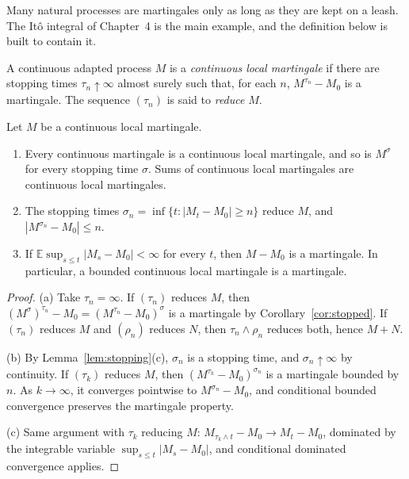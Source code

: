 Many natural processes are martingales only as long as they are kept on a leash. The It\^o integral of Chapter~4 is the main example, and the definition below is built to contain it.

\begin{definition}\label{def:localmart}
A continuous adapted process $M$ is a \emph{continuous local martingale} if there are stopping times $\tau_n\uparrow\infty$ almost surely such that, for each $n$, $M^{\tau_n}-M_0$ is a martingale.
The sequence $(\tau_n)$ is said to \emph{reduce} $M$.
\end{definition}

\begin{proposition}\label{prop:localmart}
Let $M$ be a continuous local martingale.
\begin{enumerate}[label=(\alph*)]
\item Every continuous martingale is a continuous local martingale, and so is $M^\sigma$ for every stopping time $\sigma$. Sums of continuous local martingales are continuous local martingales.
\item The stopping times $\sigma_n=\inf\{t:|M_t-M_0|\ge n\}$ reduce $M$, and $|M^{\sigma_n}-M_0|\le n$.
\item If $\mathbb E\sup_{s\le t}|M_s-M_0|<\infty$ for every $t$, then $M-M_0$ is a martingale. In particular, a bounded continuous local martingale is a martingale.
\end{enumerate}
\end{proposition}

\begin{proof}
(a) Take $\tau_n=\infty$. If $(\tau_n)$ reduces $M$, then $(M^\sigma)^{\tau_n}-M_0=(M^{\tau_n}-M_0)^\sigma$ is a martingale by Corollary~\ref{cor:stopped}. If $(\tau_n)$ reduces $M$ and $(\rho_n)$ reduces $N$, then $\tau_n\wedge\rho_n$
reduces both, hence $M+N$.

(b) By Lemma~\ref{lem:stopping}(c), $\sigma_n$ is a stopping time, and $\sigma_n\uparrow\infty$ by continuity. If $(\tau_k)$ reduces $M$, then $(M^{\tau_k}-M_0)^{\sigma_n}$ is a martingale bounded by $n$. As $k\to\infty$,
it converges pointwise to $M^{\sigma_n}-M_0$, and conditional bounded convergence preserves the martingale property.

(c) Same argument with $\tau_k$ reducing $M$: $M_{\tau_k\wedge t}-M_0\to M_t-M_0$, dominated by the integrable variable $\sup_{s\le t}|M_s-M_0|$, and conditional dominated convergence applies.
\end{proof}

